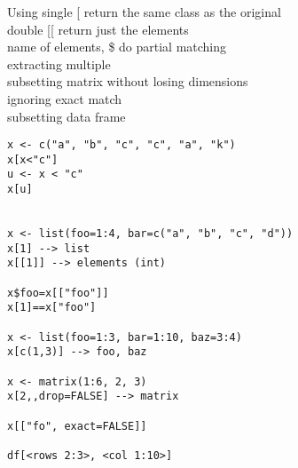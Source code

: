 \documentclass[12pt,a4paper]{report}
\begin{document}
\begin{tcolorbox}[colback=pageyl,colframe=pagebl,title= R \hfill Subsetting,coltitle=Magenta,fonttitle=\bfseries,coltext=Black,width=0.9\paperwidth,boxrule=2mm]\colorbox{pageyl}{\noindent\begin{minipage}[t]{0.3\textwidth}\sffamily \color{ctnb}\vspace{\baselineskip}
Using single [ return the same class as the original\\[4\baselineskip]
double [[ return just the elements\\[2\baselineskip]
name of elements, \$ do partial matching\\[\baselineskip]
extracting multiple\\[2\baselineskip]
subsetting matrix without losing dimensions\\[\baselineskip]
ignoring exact match\\[\baselineskip]
subsetting data frame
\end{minipage}}\qquad\begin{minipage}[t]{0.672\textwidth}
{\begin{lstlisting}[frame=single,framerule=0pt, numbers=none, numbersep=10pt, aboveskip=20pt,belowskip=20pt]
x <- c("a", "b", "c", "c", "a", "k")
x[x<"c"]
u <- x < "c"
x[u]


x <- list(foo=1:4, bar=c("a", "b", "c", "d"))
x[1] --> list
x[[1]] --> elements (int)

x$foo=x[["foo"]]
x[1]==x["foo"]

x <- list(foo=1:3, bar=1:10, baz=3:4)
x[c(1,3)] --> foo, baz

x <- matrix(1:6, 2, 3)
x[2,,drop=FALSE] --> matrix

x[["fo", exact=FALSE]]

df[<rows 2:3>, <col 1:10>]
\end{lstlisting}}\end{minipage}\end{tcolorbox}
\end{document}

